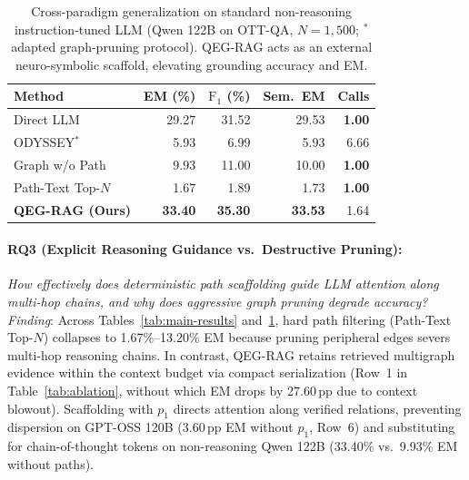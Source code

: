 \documentclass[runningheads]{llncs}
\begin{document}
\begin{table}[t]
\caption{Cross-paradigm generalization on standard non-reasoning instruction-tuned LLM (Qwen 122B on OTT-QA, $N=1{,}500$; $^*$adapted graph-pruning protocol). QEG-RAG acts as an external neuro-symbolic scaffold, elevating grounding accuracy and EM.}
\label{tab:qwen-results}
\vspace{1.0mm}
\centering
\scriptsize
\renewcommand{\arraystretch}{0.88}
\setlength{\tabcolsep}{7pt}
\begin{tabular}{@{}lrrrr@{}}
\toprule
Method & EM (\%) & $\text{F}_1$ (\%) & Sem.\ EM & Calls \\
\midrule
Direct LLM                         & 29.27 & 31.52 & 29.53 & \textbf{1.00} \\
ODYSSEY$^*$~\cite{agarwal2025hybrid} & 5.93  & 6.99  & 5.93  & 6.66 \\
Graph w/o Path                     & 9.93  & 11.00 & 10.00 & \textbf{1.00} \\
Path-Text Top-$N$                  & 1.67  & 1.89  & 1.73  & \textbf{1.00} \\
\textbf{QEG-RAG (Ours)}            & \textbf{33.40} & \textbf{35.30} & \textbf{33.53} & 1.64 \\
\bottomrule
\end{tabular}
\vspace{1.0mm}
\end{table}

\enlargethispage{2.5\baselineskip}
\paragraph{RQ3 (Explicit Reasoning Guidance vs.\ Destructive Pruning):}
\emph{How effectively does deterministic path scaffolding guide LLM attention along multi-hop chains, and why does aggressive graph pruning degrade accuracy?}
\emph{Finding}: Across Tables~\ref{tab:main-results} and~\ref{tab:qwen-results}, hard path filtering (Path-Text Top-$N$) collapses to 1.67\%--13.20\% EM because pruning peripheral edges severs multi-hop reasoning chains. In contrast, QEG-RAG retains retrieved multigraph evidence within the context budget via compact serialization (Row~1 in Table~\ref{tab:ablation}, without which EM drops by 27.60\,pp due to context blowout). Scaffolding with $p_1$ directs attention along verified relations, preventing dispersion on GPT-OSS 120B (3.60\,pp EM without $p_1$, Row~6) and substituting for chain-of-thought tokens on non-reasoning Qwen 122B (33.40\% vs.\ 9.93\% EM without paths).
\end{document}
